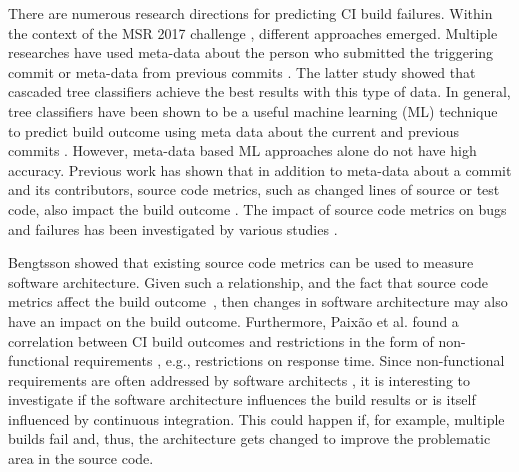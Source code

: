 \documentclass[sigconf, anonymous, review]{acmart}
\newcommand{\sn}[1]{{\color{blue}\textbf{Sarah:}~#1}}
\newcommand{\jk}[1]{{\color{violet}\textbf{Johannes:}~#1}}
\begin{document}
There are numerous research directions for predicting CI build failures. Within the context of the MSR 2017 challenge \cite{TravisTorrent}, different approaches emerged.
Multiple researches have used meta-data about the person who submitted the triggering commit \cite{ContrInvolv} or meta-data from previous commits \cite{Pred-Cascade}. The latter study showed that cascaded tree classifiers achieve the best results with this type of data. 
In general, tree classifiers have been shown to be a useful machine learning (ML) technique to predict build outcome using meta data about the current and previous commits \cite{Pred-Tree}. 
However, meta-data based ML approaches alone do not have high accuracy.
Previous work has shown that in addition to meta-data about a commit and its contributors, source code metrics, such as changed lines of source or test code, also impact the build outcome \cite{FailsCorr}. The impact of source code metrics on bugs and failures has been investigated by various studies \cite{MetricsSource1, MetricsSource2}. 

Bengtsson \cite{arc-metrics} showed that existing source code metrics can be used to measure software architecture. 
Given such a relationship, and the fact that source code metrics affect the build outcome~\cite{MetricsSource1, MetricsSource2, FailsCorr}, then changes in software architecture may also have an impact on the build outcome.
Furthermore, Paix\~{a}o et al. found a correlation between CI build outcomes and restrictions in the form of non-functional requirements \cite{Fail-NFReq}, e.g., restrictions on response time.
Since non-functional requirements are often addressed by software architects \cite{NFR-Architects}, it is interesting to investigate if the software architecture influences the build results or is itself influenced by continuous integration. 
This could happen if, for example, multiple builds fail and, thus, the architecture gets changed to improve the problematic area in the source code.

\end{document}
